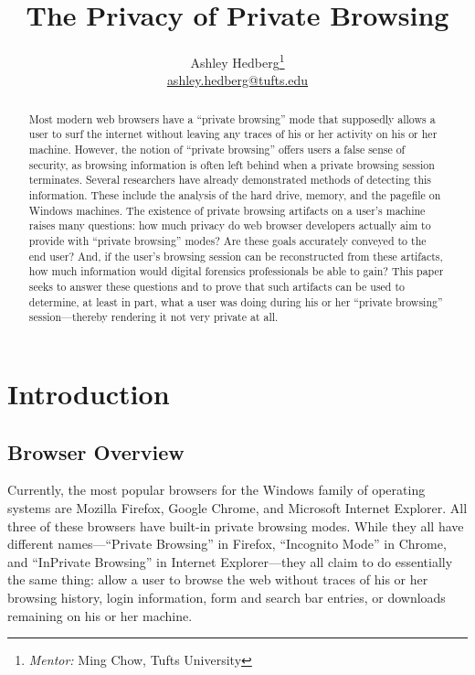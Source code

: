 \documentclass[pdftex,letterpaper,titlepage,12pt]{article}
\begin{document}
  \title{The Privacy of Private Browsing}
  \author{Ashley Hedberg\thanks{\emph{Mentor:} Ming Chow, Tufts University} \\
  \href{mailto:ashley.hedberg@tufts.edu}{ashley.hedberg@tufts.edu}}
  \date{}
  \maketitle
  
  \begin{abstract}
  Most modern web browsers have a ``private browsing'' mode that supposedly 
  allows a user to surf the internet without leaving any traces of his or her
  activity on his or her machine. However, the notion of ``private browsing'' 
  offers users a false sense of security, as browsing information is often left
  behind when a private browsing session terminates. Several researchers have 
  already demonstrated methods of detecting this information. These include the
  analysis of the hard drive, memory, and the pagefile on Windows machines.
  The existence of private browsing artifacts on a user's machine raises many 
  questions: how much privacy do web browser developers actually aim to provide
  with ``private browsing'' modes? Are these goals accurately conveyed to the 
  end user? And, if the user’s browsing session can be reconstructed from these 
  artifacts, how much information would digital forensics professionals be 
  able to gain? This paper seeks to answer these questions and to prove that 
  such artifacts can be used to determine, at least in part, what a user was 
  doing during his or her ``private browsing'' session---thereby rendering it 
  not very private at all.
  \end{abstract}

  \section{Introduction}
    \subsection{Browser Overview}
    Currently, the most popular browsers for the Windows family of operating 
    systems are Mozilla Firefox, Google Chrome, and Microsoft Internet 
    Explorer. All three of these browsers have built-in private browsing modes.
    While they all have different names---``Private Browsing'' in Firefox,
    ``Incognito Mode'' in Chrome, and ``InPrivate Browsing'' in Internet
    Explorer---they all claim to do essentially the same thing: allow a user to
    browse the web without traces of his or her browsing history, login
    information, form and search bar entries, or downloads remaining on his or
    her machine.\cite{verdi13}\cite{google13}\cite{ie13}
\end{document}
